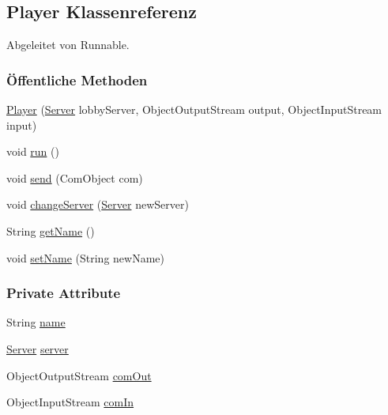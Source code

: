 \hypertarget{a00076}{\subsection{Player Klassenreferenz}
\label{a00076}
}


Abgeleitet von Runnable.

\subsubsection*{Öffentliche Methoden}
\begin{DoxyCompactItemize}
\item 
\hyperlink{a00076_a48d23656e2ce110dac280093f6d54190}{Player} (\hyperlink{a00077}{Server} lobby\-Server, Object\-Output\-Stream output, Object\-Input\-Stream input)
\item 
void \hyperlink{a00076_a13a43e6d814de94978c515cb084873b1}{run} ()
\item 
void \hyperlink{a00076_a13fa386dcc73d9e119b8af36f0cc9964}{send} (Com\-Object com)
\item 
void \hyperlink{a00076_a7656e712d839ef3c5013e7b909438111}{change\-Server} (\hyperlink{a00077}{Server} new\-Server)
\item 
String \hyperlink{a00076_a78ee178b6a73658d65ca60da4d1e6683}{get\-Name} ()
\item 
void \hyperlink{a00076_a772a23457853aff71a5c9a62c1b188a7}{set\-Name} (String new\-Name)
\end{DoxyCompactItemize}
\subsubsection*{Private Attribute}
\begin{DoxyCompactItemize}
\item 
\hypertarget{a00076_a9a2326f35466e54c36c070829245c557}{String \hyperlink{a00076_a9a2326f35466e54c36c070829245c557}{name}}\label{a00076_a9a2326f35466e54c36c070829245c557}

\item 
\hypertarget{a00076_afd1a82c786509e03b540bae82af2c137}{\hyperlink{a00077}{Server} \hyperlink{a00076_afd1a82c786509e03b540bae82af2c137}{server}}\label{a00076_afd1a82c786509e03b540bae82af2c137}

\item 
\hypertarget{a00076_a4a89fb49301c3bf13583a1ebbd622574}{Object\-Output\-Stream \hyperlink{a00076_a4a89fb49301c3bf13583a1ebbd622574}{com\-Out}}\label{a00076_a4a89fb49301c3bf13583a1ebbd622574}

\item 
\hypertarget{a00076_a9d3bfecfa3390ac5f668339005f961d6}{Object\-Input\-Stream \hyperlink{a00076_a9d3bfecfa3390ac5f668339005f961d6}{com\-In}}\label{a00076_a9d3bfecfa3390ac5f668339005f961d6}

\end{DoxyCompactItemize}


